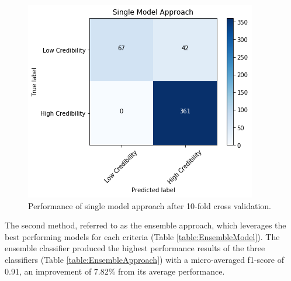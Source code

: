 \documentclass[a4paper,twoside,phd]{BYUPhys}
\begin{document}
\begin{figure}[H]
	\centering
	\includegraphics[totalheight=7cm]{images/single-model-performance.png}
	\caption{Performance of single model approach after 10-fold cross validation.}
	\label{fig:SingleModelPerformance}
\end{figure}


The second method, referred to as the ensemble approach, which leverages the best performing models for each criteria (Table \ref{table:EnsembleModel}). The ensemble classifier produced the highest performance results of the three classifiers (Table \ref{table:EnsembleApproach}) with a micro-averaged f1-score of 0.91, an improvement of 7.82\% from its average performance.
\end{document}
